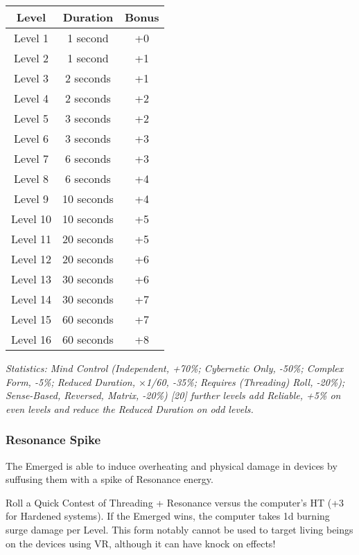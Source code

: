 \begin{multicols*}{3}
	\begin{center}
		\begin{tabular}{|c|c|c|}
			\hline
			Level & Duration & Bonus\\
			\hline
			\hline
			Level 1 & 1 second & +0 \\
			Level 2 & 1 second & +1 \\
			Level 3 & 2 seconds & +1 \\
			Level 4 & 2 seconds & +2 \\
			Level 5 & 3 seconds & +2 \\
			Level 6 & 3 seconds & +3 \\
			Level 7 & 6 seconds & +3 \\
			Level 8 & 6 seconds & +4 \\
			Level 9 & 10 seconds & +4 \\
			Level 10 & 10 seconds & +5 \\
			Level 11 & 20 seconds & +5 \\
			Level 12 & 20 seconds & +6 \\
			Level 13 & 30 seconds & +6 \\
			Level 14 & 30 seconds & +7 \\
			Level 15 & 60 seconds & +7 \\
			Level 16 & 60 seconds & +8 \\
			\hline
		\end{tabular}
	\end{center}

	\textcolor{OliveGreen}{\textit{Statistics: Mind Control (Independent, +70\%; Cybernetic Only, -50\%; Complex Form, -5\%; Reduced Duration, \(\times\)1/60, -35\%; Requires (Threading) Roll, -20\%); Sense-Based, Reversed, Matrix, -20\%) [20] further levels add Reliable, +5\% on even levels and reduce the Reduced Duration on odd levels. }}
	
	\subsubsection*{Resonance Spike}\label{resonance_spike}
	
	The Emerged is able to induce overheating and physical damage in devices by suffusing them with a spike of Resonance energy.
	
	Roll a Quick Contest of Threading + Resonance versus the computer's HT (+3 for Hardened systems). If the Emerged wins, the computer takes 1d burning surge damage per Level. This form notably cannot be used to target living beings on the devices using VR, although it can have knock on effects!
	

\end{multicols*}
